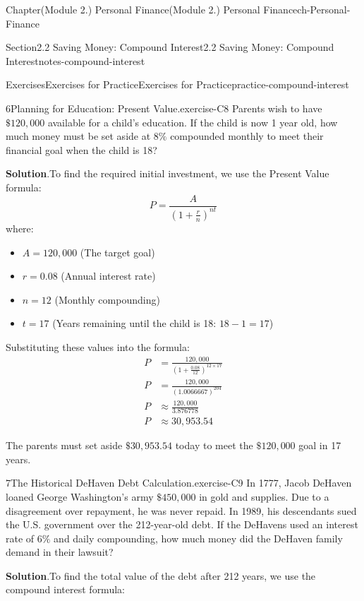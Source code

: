 \documentclass[oneside,10pt,]{book}
\newcommand{\blocktitlefont}{\relax}
\newcommand{\ptxlistdisc}{\raisebox{0.3ex}{\textbullet}}
\newcommand{\amp}{&}
\begin{document}
\begin{chapterptx}{Chapter}{(Module 2.) Personal Finance}{}{(Module 2.) Personal Finance}{}{}{ch-Personal-Finance}
\begin{sectionptx}{Section}{2.2 Saving Money: Compound Interest}{}{2.2 Saving Money: Compound Interest}{}{}{notes-compound-interest}
\begin{exercises-subsection-numberless}{Exercises}{Exercises for Practice}{}{Exercises for Practice}{}{}{practice-compound-interest}
\begin{divisionexercise}{6}{Planning for Education: Present Value.}{}{exercise-C8}%
Parents wish to have \(\$120,000\) available for a child's education. If the child is now 1 year old, how much money must be set aside at \(8\%\) compounded monthly to meet their financial goal when the child is 18?%
\par\smallskip%
\noindent\textbf{\blocktitlefont Solution}.\hypertarget{exercise-C8-3}{}\quad{}To find the required initial investment, we use the Present Value formula:%
\begin{equation*}
P = \frac{A}{(1 + \frac{r}{n})^{nt}}
\end{equation*}
where:%
\begin{itemize}[label=\ptxlistdisc]
\item{}\(A = 120,000\) (The target goal)%
\item{}\(r = 0.08\) (Annual interest rate)%
\item{}\(n = 12\) (Monthly compounding)%
\item{}\(t = 17\) (Years remaining until the child is 18: \(18 - 1 = 17\))%
\end{itemize}
%
\par
Substituting these values into the formula:%
\begin{align*}
P \amp = \frac{120,000}{(1 + \frac{0.08}{12})^{12 \times 17}}\\
P \amp = \frac{120,000}{(1.0066667)^{204}}\\
P \amp \approx \frac{120,000}{3.876778}\\
P \amp \approx 30,953.54
\end{align*}
%
\par
The parents must set aside \(\$30,953.54\) today to meet the \(\$120,000\) goal in 17 years.%
\end{divisionexercise}%
\begin{divisionexercise}{7}{The Historical DeHaven Debt Calculation.}{}{exercise-C9}%
In 1777, Jacob DeHaven loaned George Washington's army \(\$450,000\) in gold and supplies. Due to a disagreement over repayment, he was never repaid. In 1989, his descendants sued the U.S. government over the 212-year-old debt. If the DeHavens used an interest rate of \(6\%\) and daily compounding, how much money did the DeHaven family demand in their lawsuit?%
\par\smallskip%
\noindent\textbf{\blocktitlefont Solution}.\hypertarget{exercise-C9-3}{}\quad{}To find the total value of the debt after 212 years, we use the compound interest formula:%

\end{divisionexercise}
\end{exercises-subsection-numberless}
\end{sectionptx}
\end{chapterptx}
\end{document}
